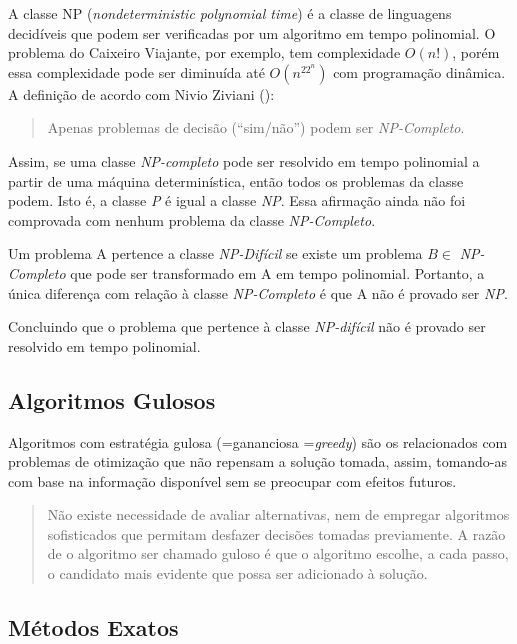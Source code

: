 A classe NP (\emph{nondeterministic polynomial time}) é a classe de linguagens decidíveis que podem ser verificadas por um algoritmo em tempo polinomial. O problema do Caixeiro Viajante, por exemplo, tem complexidade $O(n!)$, porém essa complexidade pode ser diminuída até $O(n^22^n)$ com programação dinâmica. A definição de acordo com Nivio Ziviani (\citeyear{ziviani}):

\begin{quote}
Apenas problemas de decisão (“sim/não”) podem ser \emph{NP-Completo}.
\end{quote}

Assim, se uma classe \emph{NP-completo} pode ser resolvido em tempo polinomial a partir de uma máquina determinística, então todos os problemas da classe podem. Isto é, a classe \emph{P} é igual a classe \emph{NP}. Essa afirmação ainda não foi comprovada com nenhum problema da classe \emph{NP-Completo}.

Um problema A pertence a classe \emph{NP-Difícil} se existe um problema $B \in $ \emph{NP-Completo} que pode ser transformado em A em tempo polinomial. Portanto, a única diferença com relação à classe \emph{NP-Completo} é que A não é provado ser \emph{NP}.
\cite[p. 4]{bueno}

Concluindo que o problema que pertence à classe \emph{NP-difícil} não é provado ser resolvido em tempo polinomial.

\subsection{Algoritmos Gulosos}
\label{gulosos}
Algoritmos com estratégia gulosa (=gananciosa =\emph{greedy}) \cite{feofiloff} são os relacionados com problemas de otimização que não repensam a solução tomada, assim, tomando-as com base na informação disponível sem se preocupar com efeitos futuros. 

\begin{quote}
Não existe necessidade de avaliar alternativas, nem de empregar algoritmos sofisticados que permitam desfazer decisões tomadas previamente. A razão de o algoritmo ser chamado guloso é que o algoritmo escolhe, a cada passo, o candidato mais evidente que possa ser adicionado à solução.
\end{quote}

\subsection{Métodos Exatos} \label{metodos-exatos}


